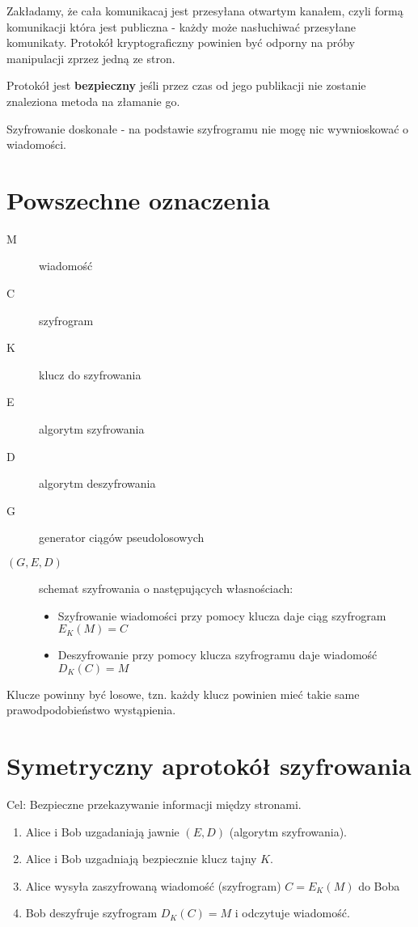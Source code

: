 \documentclass{report}
\begin{document}
Zakładamy, że cała komunikacaj jest przesyłana otwartym kanałem, czyli formą komunikacji która jest publiczna - każdy może nasłuchiwać przesyłane komunikaty. Protokół kryptograficzny powinien być odporny na próby manipulacji zprzez jedną ze stron.

Protokół jest \textbf{bezpieczny} jeśli przez czas od jego publikacji nie zostanie znaleziona metoda na złamanie go.

Szyfrowanie doskonałe - na podstawie szyfrogramu nie mogę nic wywnioskować o wiadomości.

\section{Powszechne oznaczenia}

\begin{description}
\item[M] wiadomość
\item[C] szyfrogram
\item[K] klucz do szyfrowania
\item[E] algorytm szyfrowania
\item[D] algorytm deszyfrowania
\item[G] generator ciągów pseudolosowych
\item[$(G, E, D)$] schemat szyfrowania o następujących własnościach:
	\begin{itemize}
		\item Szyfrowanie wiadomości przy pomocy klucza daje ciąg szyfrogram $E_K(M) = C$
		\item Deszyfrowanie przy pomocy klucza szyfrogramu daje wiadomość $D_K(C) = M$
	\end{itemize}
\end{description}

Klucze powinny być losowe, tzn. każdy klucz powinien mieć takie same prawodpodobieństwo wystąpienia.

\section{Symetryczny aprotokół szyfrowania}

Cel: Bezpieczne przekazywanie informacji między stronami.

\begin{enumerate}
\item Alice i Bob uzgadaniają jawnie $(E, D)$ (algorytm szyfrowania).
\item Alice i Bob uzgadniają bezpiecznie klucz tajny $K$.
\item Alice wysyła zaszyfrowaną wiadomość (szyfrogram) $C = E_K(M)$ do Boba
\item Bob deszyfruje szyfrogram $D_K(C) = M$ i odczytuje wiadomość.
\end{enumerate}
\end{document}

